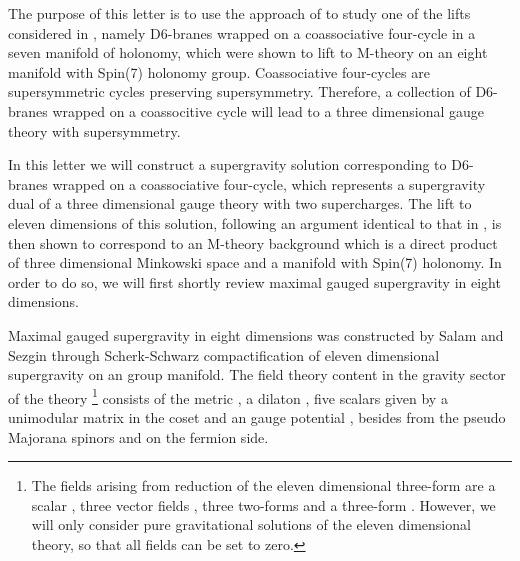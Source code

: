 \documentclass[12pt,a4paper]{article}
\begin{document}
The purpose of this letter is to use the approach of \cite{EN} to study one of the lifts 
considered in \cite{Gomis}, namely D6-branes wrapped on a coassociative four-cycle in a seven 
manifold of \coordHE{} holonomy, which were shown to lift to M-theory on an eight manifold with 
Spin(7) holonomy group. Coassociative four-cycles are supersymmetric cycles preserving \coordHE{} 
supersymmetry. Therefore, a collection of D6-branes wrapped on a coassocitive cycle will lead 
to a three dimensional gauge theory with \coordHE{} supersymmetry.
  
In this letter we will construct a supergravity solution corresponding to D6-branes wrapped 
on a coassociative four-cycle, which represents a supergravity dual of a three dimensional 
gauge theory with two supercharges. The lift to eleven dimensions of this solution, following 
an argument identical to that in \cite{EN}, is then shown to correspond to an M-theory 
background which is a direct product of three dimensional Minkowski space and a manifold 
with Spin(7) holonomy. In order to do so, we will first shortly review maximal gauged 
supergravity in eight dimensions.
  
Maximal gauged supergravity in eight dimensions was constructed by Salam and Sezgin \cite{Salam}
through Scherk-Schwarz compactification \cite{Scherk} of eleven dimensional supergravity on 
an \coordHE{} group manifold. The field theory content in the gravity sector of the theory 
\footnote{The fields arising from reduction of the eleven dimensional three-form are a scalar 
\coordHE{}, three vector fields \coordHE{}, three two-forms \coordHE{} and a three-form \coordHE{}. However, 
we will only consider pure gravitational solutions of the eleven dimensional theory, so that 
all \coordHE{} fields can be set to zero.} consists of the metric \coordHE{}, a dilaton 
\myHighlight{$\Phi$}\coordHE{}, five scalars given by a unimodular \coordHE{} matrix \coordHE{} in the coset 
\coordHE{} and an \coordHE{} gauge potential \coordHE{}, besides from the pseudo Majorana 
spinors \myHighlight{$\psi_{\mu}$}\coordHE{} and \coordHE{} on the fermion side.
  
\end{document}
